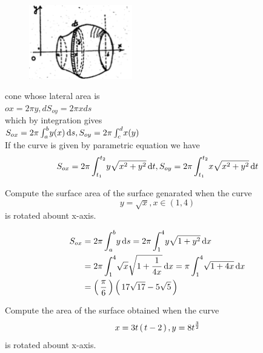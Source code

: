 \documentclass[11pt]{amsbook}
\begin{document}

\begin{figure}
	\includegraphics[width=0.40\textwidth]{images/b1p2-481}
	  \vspace{-20pt}
\end{figure}
\noindent cone whose lateral area is \vspace{10pt} \\
${ox} = 2\pi y , dS_{oy}=2\pi xds $ \vspace{10pt} \\ 
which by integration gives \vspace{10pt} \\
$S_{ox} = 2\pi \int_{a}^{b} \! y(x) \, \mathrm{d} s , S_{oy} = 2\pi \int_{c}^{d}\! x(y)$ \vspace{10pt} \\
If the curve is given by parametric equation we have 
$$ 
S_{ox} = 2\pi \int_{t_1}^{t_2} \! y\sqrt{x^2+y^2} \, \mathrm{d} t , 
S_{oy} = 2\pi \int_{t_1}^{t_2} \! x\sqrt{x^2+y^2}\, \mathrm{d} t 
$$
\begin{exmp}
Compute the surface area of the surface genarated when the curve 
\[y= \sqrt{x} , x\in (1,4)\]
is rotated abount x-axis.
\end{exmp}

\begin{hSolution}
  \begin{equation}
    \begin{split}
      S_{ox} &= 2\pi \int_a^b \! y \, \mathrm{d} s = 2\pi \int_1^4 \! y\sqrt{1+y^2} \, \mathrm{d} x \\
      &= 2\pi \int_1^4 \! \sqrt{x} \sqrt{1+\frac{1}{4x}} \, \mathrm{d} x = \pi \int_1^4 \! \sqrt{1+4x} \, \mathrm{d} x \\
      &=  \left( \, \frac{\pi}{6} \, \right)   \left( \, 17\sqrt{17}-5\sqrt{5} \, \right) 
    \end{split}
  \end{equation}
\end{hSolution}

\begin{exmp}{}
  Compute the area of the surface obtained when the curve 
  $$x = 3t \left( \, t-2 \, \right)  , y = 8t^\frac{3}{2}$$
  is rotated abount x-axis.
\end{exmp}
\end{document}
